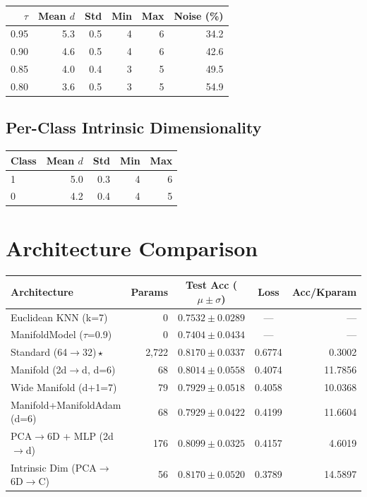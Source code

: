 \documentclass[11pt,letterpaper]{article}
\begin{document}
\begin{tabular}{@{}rrrrrr@{}}
\toprule
$\tau$ & Mean $d$ & Std & Min & Max & Noise (\%) \\
\midrule
  0.95 & 5.3 & 0.5 & 4 & 6 & 34.2 \\
  0.90 & 4.6 & 0.5 & 4 & 6 & 42.6 \\
  0.85 & 4.0 & 0.4 & 3 & 5 & 49.5 \\
  0.80 & 3.6 & 0.5 & 3 & 5 & 54.9 \\
\bottomrule
\end{tabular}

\subsection{Per-Class Intrinsic Dimensionality}

\begin{tabular}{@{}lrrrr@{}}
\toprule
Class & Mean $d$ & Std & Min & Max \\
\midrule
  1 & 5.0 & 0.3 & 4 & 6 \\
  0 & 4.2 & 0.4 & 4 & 5 \\
\bottomrule
\end{tabular}

\section{Architecture Comparison}

{\small
\begin{tabular}{@{}p{7cm}rccr@{}}
\toprule
\textbf{Architecture} & \textbf{Params} & \textbf{Test Acc ($\mu \pm \sigma$)} & \textbf{Loss} & \textbf{Acc/Kparam} \\
\midrule
  {Euclidean KNN (k=7)} & 0 & $0.7532 \pm 0.0289$ & --- & --- \\
  {ManifoldModel ($\tau$=0.9)} & 0 & $0.7404 \pm 0.0434$ & --- & --- \\
  {\color{wincolor}Standard (64$\rightarrow$32)\,$\star$} & 2,722 & $0.8170 \pm 0.0337$ & 0.6774 & 0.3002 \\
  {Manifold (2d$\rightarrow$d, d=6)} & 68 & $0.8014 \pm 0.0558$ & 0.4074 & 11.7856 \\
  {Wide Manifold (d+1=7)} & 79 & $0.7929 \pm 0.0518$ & 0.4058 & 10.0368 \\
  {Manifold+ManifoldAdam (d=6)} & 68 & $0.7929 \pm 0.0422$ & 0.4199 & 11.6604 \\
  {PCA$\rightarrow$6D + MLP (2d$\rightarrow$d)} & 176 & $0.8099 \pm 0.0325$ & 0.4157 & 4.6019 \\
  {Intrinsic Dim (PCA$\rightarrow$6D$\rightarrow$C)} & 56 & $0.8170 \pm 0.0520$ & 0.3789 & 14.5897 \\
\bottomrule
\end{tabular}
}
\end{document}
